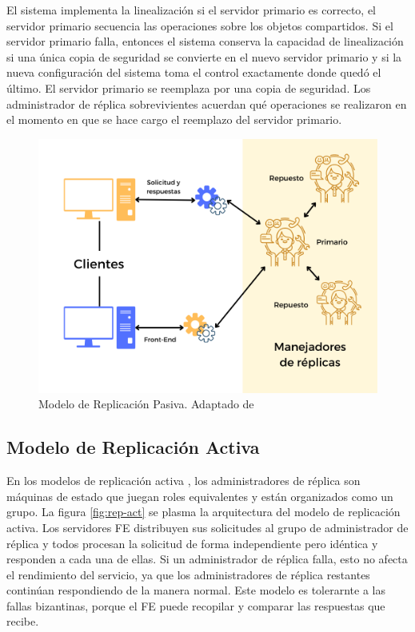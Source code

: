  
 El sistema implementa la linealización si el servidor primario es correcto, el servidor  primario secuencia  las operaciones sobre los objetos compartidos. 
 Si el servidor primario falla, entonces el sistema conserva la capacidad de linealización si una única copia de seguridad se convierte en el nuevo servidor primario y si la nueva configuración del sistema toma el control exactamente donde quedó el último.
 El servidor primario se reemplaza por una copia de seguridad. 
 Los administrador de réplica sobrevivientes acuerdan qué operaciones se realizaron en el momento en que se hace cargo el reemplazo del servidor  primario.
 
 
 	\begin{figure}%
 		\includegraphics {9/5.png} 
 		\caption{Modelo de Replicación Pasiva. Adaptado de \cite{Coulouris2011}}
 		\label{fig:rep-pas}
 	\end{figure}
 
  \subsection{Modelo de Replicación Activa} 	
 
	
	 En los modelos de  replicación activa , los administradores de réplica son máquinas de estado que juegan roles equivalentes y están organizados como un grupo. 
	La figura \ref{fig:rep-act} se plasma la  arquitectura del modelo de  replicación activa. Los servidores FE distribuyen sus solicitudes al grupo de administrador de réplica y todos  procesan la solicitud de forma independiente pero idéntica y responden a cada una de ellas. 
	 Si un administrador de réplica falla, esto no afecta el rendimiento del servicio, ya que los administradores de réplica restantes continúan respondiendo de la manera normal. 
	Este modelo es  tolerarnte a las  fallas bizantinas, porque el FE puede recopilar y comparar las respuestas que recibe.
	 

